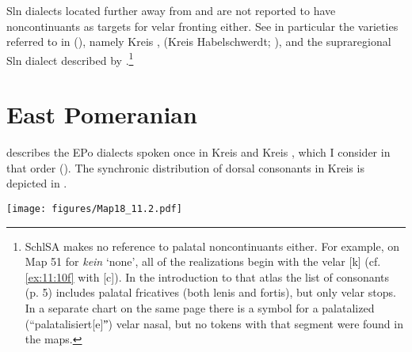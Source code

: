 Sln dialects located further away from  and  are not reported to have noncontinuants as targets for velar fronting either. See in particular the varieties referred to in  (), namely Kreis  \citep{Halbsguth1938},  (Kreis Habelschwerdt; \citealt{Pautsch1901}), and the supraregional Sln dialect described by \citet{vonUnwert1908}.\footnote{SchlSA makes no reference to palatal noncontinuants either. For example, on Map 51 for  \textit{kein}  ‘none’, all of the realizations begin with the velar [k] (cf. \ref{ex:11:10f} with [c]). In the introduction to that atlas the list of consonants (p. 5) includes palatal fricatives (both lenis and fortis), but only velar stops. In a separate chart on the same page there is a symbol for a palatalized (“palatalisiert[e]ˮ) velar nasal, but no tokens with that segment were found in the maps.}

\section{East Pomeranian}\label{sec:11.5}

\citet{Mischke1936} describes the EPo dialects spoken once in Kreis  and Kreis , which I consider in that order (). The synchronic distribution of dorsal consonants in Kreis  is depicted in .

\begin{map}
\texttt{[image: figures/Map18\_11.2.pdf]}
\caption[East Pomeranian, Low Prussian, and High Prussian]{East Pomeranian (EPo), Low Prussian (LPr), and High Prussian (HPr). Squares indicate postsonorant velar fronting, and the circle indicates the absence of postsonorant velar fronting. 1=\citet{Teuchert1913}, 2=\citet{Semrau1915a, Semrau1915b}, 3=\citet{Pirk1928}, 4=\citet{Mahnke1931}, 5=\citet{Kühl1932}, 6=\citet{Mischke1936} (Kreis ), 7=\citet{Mischke1936} (Kreis ), 8=\citet{Stritzel1937} (Kreis ), 9=\citet{Stritzel1937} (Kreis ), 10=\citealt{Tita1921}, 11=\citet{Darski1973}, 12=\citet{Kuck1933}, 13=\citet{KuckWiesinger1965}, 14=\citet{Wagner1912}, 15=\citet{Mitzka1919}, 16=\citet{Mitzka1922}, 17=\citet{Natau1937}, 18=\citet{Bink1953}, 19=\citet{Tessmann1966}.}\label{map:18}
\end{map}

